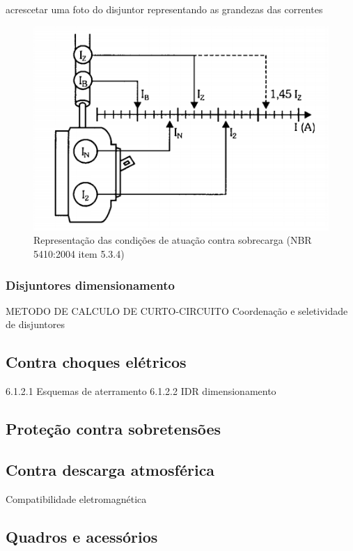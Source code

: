 acrescetar uma foto do disjuntor representando as grandezas das correntes
\begin{figure}[ht]
    \centering
    \includegraphics{image/disjAtua.png}
    \caption{Representação das condições de atuação contra sobrecarga (NBR 5410:2004 item 5.3.4)}
    \label{fig:disjatu}
\end{figure}

\subsubsection{ Disjuntores dimensionamento}

		METODO DE CALCULO DE CURTO-CIRCUITO
		Coordenação e seletividade de disjuntores
\subsection{ Contra choques elétricos }
	6.1.2.1 Esquemas de aterramento
	6.1.2.2 IDR dimensionamento

\subsection{ Proteção contra sobretensões}

\subsection{ Contra descarga atmosférica}

	Compatibilidade eletromagnética
\subsection{Quadros e acessórios}

